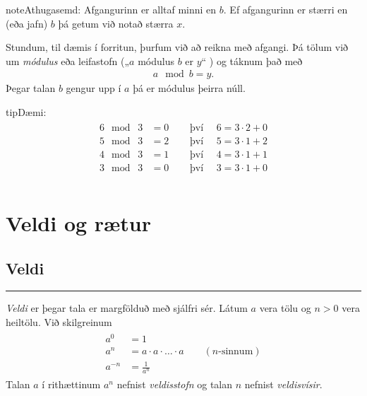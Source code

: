 \documentclass[a4paper,10pt,icelandic]{sphinxmanual}
\begin{document}
\begin{sphinxadmonition}{note}{Athugasemd:}
Afgangurinn er alltaf minni en \(b\). Ef afgangurinn er stærri en (eða jafn) \(b\) þá getum við notað stærra \(x\).
\end{sphinxadmonition}

Stundum, til dæmis í forritun, þurfum við að reikna með afgangi.
Þá tölum við um \textit{módulus} eða leifastofn („\(a\) módulus \(b\) er \(y\)“ ) og táknum það með
\begin{equation*}
\begin{split}a\mod b = y.\end{split}
\end{equation*}
Þegar talan \(b\) gengur upp í \(a\) þá er módulus þeirra núll.

\begin{sphinxadmonition}{tip}{Dæmi:}\begin{equation*}
\begin{split}\begin{aligned}
  6 \mod \; 3 &=0 \quad & \text{ því } \quad 6 = 3\cdot 2 + 0\\
  5 \mod \; 3 &=2 \quad & \text{ því } \quad 5 = 3\cdot 1 + 2\\
  4 \mod \; 3 &=1 \quad & \text{ því } \quad 4 = 3\cdot 1 + 1 \\
  3 \mod \; 3 &=0 \quad & \text{ því } \quad 3 = 3\cdot 1 + 0 \\
\end{aligned}\end{split}
\end{equation*}\end{sphinxadmonition}


\section{Veldi og rætur}
\label{\detokenize{Kafli01:veldi-og-raetur}}

\subsection{Veldi}
\label{\detokenize{Kafli01:veldi}}

\bigskip\hrule\bigskip


\textit{Veldi} er þegar tala er margfölduð með sjálfri sér.
Látum \(a\) vera tölu og \(n>0\) vera heiltölu. Við skilgreinum
\begin{equation*}
\begin{split}\begin{aligned}
      a^0&=1 \\
      a^n&=a \cdot a \cdot \dots \cdot a \qquad (n\text{-sinnum}) \\
      a^{-n}&=\frac{1}{a^n}
\end{aligned}\end{split}
\end{equation*}
Talan \(a\) í rithættinum \(a^n\) nefnist \textit{veldisstofn} og talan \(n\) nefnist \textit{veldisvísir}.
\end{document}
